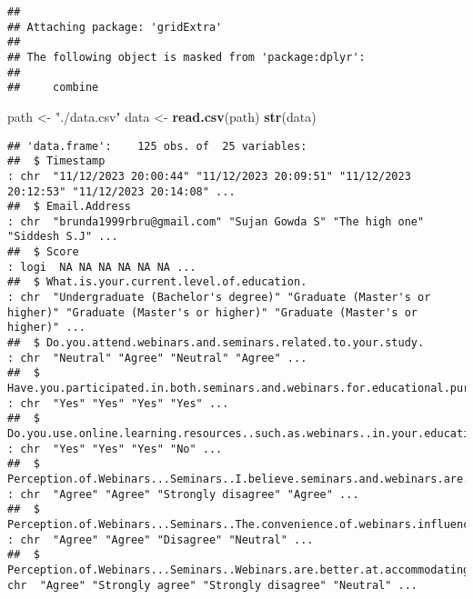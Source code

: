 \documentclass[
]{article}
\newenvironment{Shaded}{\begin{snugshade}}{\end{snugshade}}
\newcommand{\FunctionTok}[1]{\textcolor[rgb]{0.13,0.29,0.53}{\textbf{#1}}}
\newcommand{\NormalTok}[1]{#1}
\newcommand{\OtherTok}[1]{\textcolor[rgb]{0.56,0.35,0.01}{#1}}
\newcommand{\StringTok}[1]{\textcolor[rgb]{0.31,0.60,0.02}{#1}}
\begin{document}
\begin{verbatim}
## 
## Attaching package: 'gridExtra'
## 
## The following object is masked from 'package:dplyr':
## 
##     combine
\end{verbatim}

\begin{Shaded}
\begin{Highlighting}[]
\NormalTok{path }\OtherTok{\textless{}{-}} \StringTok{"./data.csv"}
\NormalTok{data }\OtherTok{\textless{}{-}} \FunctionTok{read.csv}\NormalTok{(path) }
\FunctionTok{str}\NormalTok{(data)}
\end{Highlighting}
\end{Shaded}

\begin{verbatim}
## 'data.frame':    125 obs. of  25 variables:
##  $ Timestamp                                                                                                              : chr  "11/12/2023 20:00:44" "11/12/2023 20:09:51" "11/12/2023 20:12:53" "11/12/2023 20:14:08" ...
##  $ Email.Address                                                                                                          : chr  "brunda1999rbru@gmail.com" "Sujan Gowda S" "The high one" "Siddesh S.J" ...
##  $ Score                                                                                                                  : logi  NA NA NA NA NA NA ...
##  $ What.is.your.current.level.of.education.                                                                               : chr  "Undergraduate (Bachelor's degree)" "Graduate (Master's or higher)" "Graduate (Master's or higher)" "Graduate (Master's or higher)" ...
##  $ Do.you.attend.webinars.and.seminars.related.to.your.study.                                                             : chr  "Neutral" "Agree" "Neutral" "Agree" ...
##  $ Have.you.participated.in.both.seminars.and.webinars.for.educational.purposes.                                          : chr  "Yes" "Yes" "Yes" "Yes" ...
##  $ Do.you.use.online.learning.resources..such.as.webinars..in.your.education.                                             : chr  "Yes" "Yes" "Yes" "No" ...
##  $ Perception.of.Webinars...Seminars..I.believe.seminars.and.webinars.are.effective.for.enhancing.student.engagement.     : chr  "Agree" "Agree" "Strongly disagree" "Agree" ...
##  $ Perception.of.Webinars...Seminars..The.convenience.of.webinars.influences.students..participation..                    : chr  "Agree" "Agree" "Disagree" "Neutral" ...
##  $ Perception.of.Webinars...Seminars..Webinars.are.better.at.accommodating.students..busy.schedules.compared.to.seminars..: chr  "Agree" "Strongly agree" "Strongly disagree" "Neutral" ...

\end{verbatim}
\end{document}
